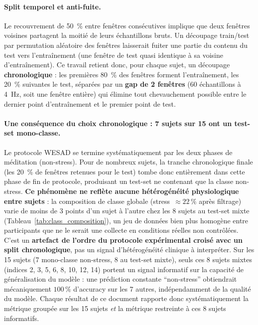 \documentclass{acmart}
\begin{document}
\paragraph{Split temporel et anti-fuite.} Le recouvrement de 50~\% entre
fenêtres consécutives implique que deux fenêtres voisines partagent la moitié
de leurs échantillons bruts. Un découpage train/test par permutation
aléatoire des fenêtres laisserait fuiter une partie du contenu du test vers
l'entraînement (une fenêtre de test quasi identique à sa voisine
d'entraînement). Ce travail retient donc, pour chaque sujet, un découpage
\textbf{chronologique} : les premières 80~\% des fenêtres forment
l'entraînement, les 20~\% suivantes le test, séparées par un
\textbf{gap de 2 fenêtres} (60 échantillons à 4~Hz, soit une fenêtre entière)
qui élimine tout chevauchement possible entre le dernier point
d'entraînement et le premier point de test.

\paragraph{Une conséquence du choix chronologique : 7 sujets sur 15 ont un
test-set mono-classe.} Le protocole WESAD se termine systématiquement par les
deux phases de méditation (non-stress). Pour de nombreux sujets, la tranche
chronologique finale (les 20~\% de fenêtres retenues pour le test) tombe donc
entièrement dans cette phase de fin de protocole, produisant un test-set ne
contenant que la classe non-stress. \textbf{Ce phénomène ne reflète aucune
hétérogénéité physiologique entre sujets} : la composition de classe globale
(stress~$\approx 22\,\%$ après filtrage) varie de moins de 3 points d'un
sujet à l'autre chez les 8 sujets au test-set mixte
(Tableau~\ref{tab:class_composition}), un jeu de données bien plus homogène
entre participants que ne le serait une collecte en conditions réelles non
contrôlées. C'est un \textbf{artefact de l'ordre du protocole
expérimental croisé avec un split chronologique}, pas un signal
d'hétérogénéité clinique à interpréter. Sur les 15 sujets (7 mono-classe
non-stress, 8 au test-set mixte), seuls ces 8 sujets mixtes (indices 2, 3, 5,
6, 8, 10, 12, 14) portent un signal informatif sur la capacité de
généralisation du modèle : une prédiction constante ``non-stress''
obtiendrait mécaniquement $100\,\%$ d'accuracy sur les 7 autres,
indépendamment de la qualité du modèle. Chaque résultat de ce
document rapporte donc systématiquement la métrique groupée sur les 15 sujets
\emph{et} la métrique restreinte à ces 8 sujets informatifs.
\end{document}

